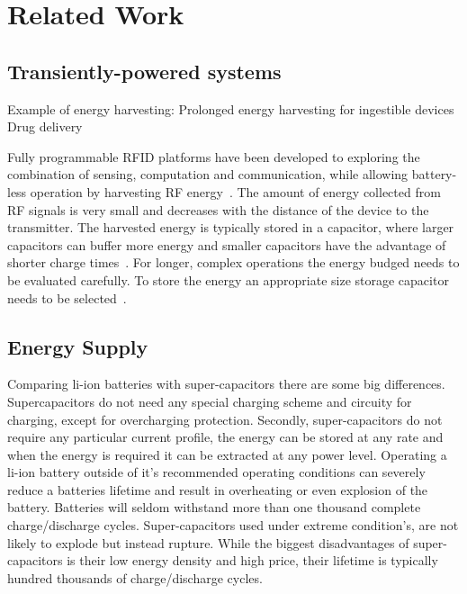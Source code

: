 \chapter{Related Work}
\label{chp:related_work}

\section{Transiently-powered systems}


Example of energy harvesting: Prolonged energy harvesting for ingestible devices~\cite{plonski_tranro_2016}
Drug delivery


Fully programmable RFID platforms have been developed to exploring the combination of sensing, computation and communication, while allowing battery-less operation by harvesting RF energy~\cite{sample_transim_2008}.
The amount of energy collected from RF signals is very small and decreases with the distance of the device to the transmitter.
The harvested energy is typically stored in a capacitor, where larger capacitors can buffer more energy and smaller capacitors have the advantage of shorter charge times~\cite{gummerson_mobisys_2010}.
For longer, complex operations the energy budged needs to be evaluated carefully.
To store the energy an appropriate size storage capacitor needs to be selected~\cite{naderiparizi_rfid_2015}.


\section{Energy Supply}


Comparing li-ion batteries with super-capacitors there are some big differences.
Supercapacitors do not need any special charging scheme and circuity for charging, except for overcharging protection.
Secondly, super-capacitors do not require any particular current profile, the energy can be stored at any rate and when the energy is required it can be extracted at any power level.
Operating a li-ion battery outside of it's recommended operating conditions can severely reduce a batteries lifetime and result in overheating or even explosion of the battery.
Batteries will seldom withstand more than one thousand complete charge/discharge cycles.
Super-capacitors used under extreme condition's, are not likely to explode but instead rupture.
While the biggest disadvantages of super-capacitors is their low energy density and high price, their lifetime is typically hundred thousands of charge/discharge cycles.

